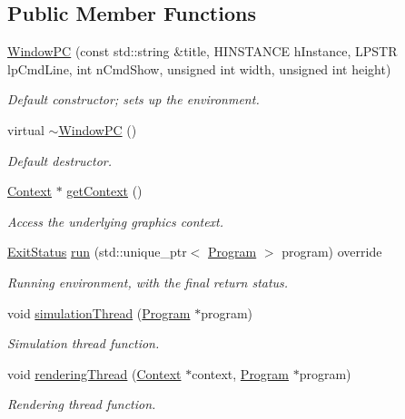 \subsection*{Public Member Functions}
\begin{DoxyCompactItemize}
\item 
\hyperlink{class_window_p_c_a96a4c01f2eaa2a07d3ad67e993c241c8}{Window\+PC} (const std\+::string \&title, H\+I\+N\+S\+T\+A\+N\+CE h\+Instance, L\+P\+S\+TR lp\+Cmd\+Line, int n\+Cmd\+Show, unsigned int width, unsigned int height)
\begin{DoxyCompactList}\small\item\em Default constructor; sets up the environment. \end{DoxyCompactList}\item 
virtual \hyperlink{class_window_p_c_a0524b2e9b75c81207d4874809f687110}{$\sim$\+Window\+PC} ()
\begin{DoxyCompactList}\small\item\em Default destructor. \end{DoxyCompactList}\item 
\hyperlink{class_context}{Context} $\ast$ \hyperlink{class_window_p_c_af211b371f3cbe8cda20dbeb47ad9a359}{get\+Context} ()
\begin{DoxyCompactList}\small\item\em Access the underlying graphics context. \end{DoxyCompactList}\item 
\hyperlink{_window_8h_ae189a3c432aa37137a55df8c91c579ed}{Exit\+Status} \hyperlink{class_window_p_c_a37f3734410e8a9d99b5de80de7c14bf5}{run} (std\+::unique\+\_\+ptr$<$ \hyperlink{class_program}{Program} $>$ program) override
\begin{DoxyCompactList}\small\item\em Running environment, with the final return status. \end{DoxyCompactList}\item 
void \hyperlink{class_window_p_c_ae12f24716fa0b959e65580aead8f3fc9}{simulation\+Thread} (\hyperlink{class_program}{Program} $\ast$program)
\begin{DoxyCompactList}\small\item\em Simulation thread function. \end{DoxyCompactList}\item 
void \hyperlink{class_window_p_c_a329f37bb75b5ed1c5303fde8b7cef63f}{rendering\+Thread} (\hyperlink{class_context}{Context} $\ast$context, \hyperlink{class_program}{Program} $\ast$program)
\begin{DoxyCompactList}\small\item\em Rendering thread function. \end{DoxyCompactList}\end{DoxyCompactItemize}

